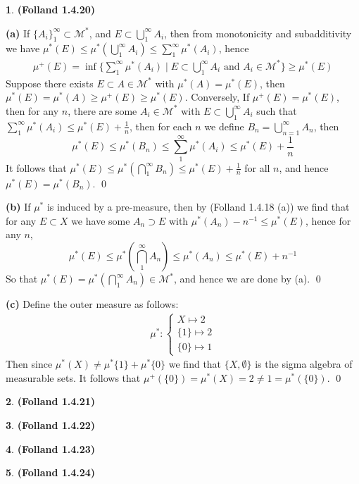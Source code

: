 \documentclass[10.5pt]{article}
\theoremstyle{definition}
\newtheorem{pb}{}
\newcommand{\set}[1]{\{#1\}}
\newcommand{\tand}{\text{ and }}
\begin{document}
    \begin{pb}\textbf{(Folland 1.4.20)}

        \textbf{(a)} If \(\set{A_i}_1^\infty \subset \mathcal{M}^*\), and \(E \subset \bigcup_1^\infty A_i\), then from monotonicity and subadditivity we have \(\mu^*(E) \leq \mu^*(\bigcup_1^\infty A_i) \leq \sum_1^\infty \mu^*(A_i)\), hence
        \begin{align*}
            \mu^+(E) = \inf\set{\sum_1^\infty \mu^*(A_i) \mid E \subset \bigcup_1^\infty A_i \tand A_i \in \mathcal{M}^*} \geq \mu^*(E)
        \end{align*}
        Suppose there exists \(E \subset A \in \mathcal{M}^*\) with \(\mu^*(A) = \mu^*(E)\), then \(\mu^*(E) = \mu^*(A) \geq \mu^+(E) \geq \mu^*(E)\). Conversely, If \(\mu^+(E) = \mu^*(E)\), then for any \(n\), there are some \(A_i \in \mathcal{M}^*\) with \(E \subset \bigcup_1^\infty A_i\) such that \(\sum_1^\infty \mu^*(A_i) \leq \mu^*(E) + \frac{1}{n}\), then for each \(n\) we define \(B_n = \bigcup_{n=1}^\infty A_n\), then 
        \[\mu^*(E) \leq \mu^*(B_n) \leq \sum_1^\infty \mu^*(A_i) \leq \mu^*(E) + \frac{1}{n}\]
        It follows that \(\mu^*(E) \leq \mu^*(\bigcap_1^\infty B_n) \leq \mu^*(E) + \frac{1}{n}\) for all \(n\), and hence \(\mu^*(E) = \mu^*(B_n)\). \qed

        \textbf{(b)} If \(\mu^*\) is induced by a pre-measure, then by (Folland 1.4.18 (a)) we find that for any \(E \subset X\) we have some \(A_n \supset E\) with \(\mu^*(A_n) - n^{-1} \leq \mu^*(E)\), hence for any \(n\), \[\mu^*(E) \leq \mu^*(\bigcap_1^\infty A_n) \leq \mu^*(A_n) \leq \mu^*(E) + n^{-1}\]
        So that \(\mu^*(E) = \mu^*(\bigcap_1^\infty A_n) \in \mathcal{M}^* \), and hence we are done by (a). \qed

        \textbf{(c)} Define the outer measure as follows:
        \begin{align*}
            \mu^*: \begin{cases}
                X \mapsto 2 \\
                \set{1} \mapsto 2 \\
                \set{0} \mapsto 1
            \end{cases}
        \end{align*}
        Then since \(\mu^*(X) \neq \mu^*\set{1} + \mu^*\set{0}\) we find that \(\set{X,\emptyset}\) is the sigma algebra of measurable sets. It follows that \(\mu^+(\set{0}) = \mu^*(X) = 2 \neq 1 = \mu^*(\set{0})\). \qed
    \end{pb}
    \begin{pb}\textbf{(Folland 1.4.21)}
        
    \end{pb}
    \begin{pb}\textbf{(Folland 1.4.22)}
        
    \end{pb}
    \begin{pb}\textbf{(Folland 1.4.23)}
        
    \end{pb}
    \begin{pb}\textbf{(Folland 1.4.24)}
        
    \end{pb}
\end{document}
